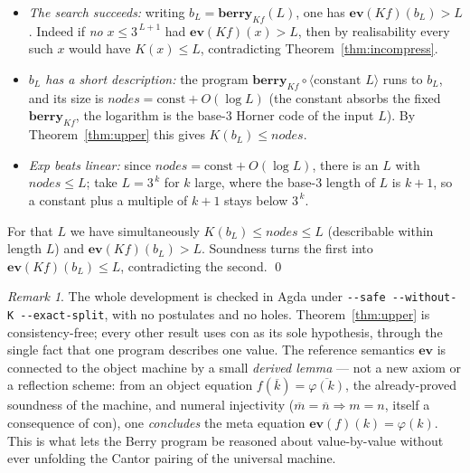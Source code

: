 \documentclass[11pt]{article}
\theoremstyle{plain}
\theoremstyle{definition}
\theoremstyle{remark}
\newtheorem{remark}[theorem]{Remark}
\newcommand{\ev}{\mathbf{ev}}
\newcommand{\Kc}{K}
\newcommand{\nodes}{\mathit{nodes}}
\newcommand{\Berry}{\mathbf{berry}}
\begin{document}
\begin{itemize}
\item \emph{The search succeeds:} writing $b_L=\Berry_{K\!f}(L)$, one has
  $\ev(K\!f)(b_L)>L$. Indeed if \emph{no} $x\le 3^{\,L+1}$ had
  $\ev(K\!f)(x)>L$, then by realisability every such $x$ would have
  $\Kc(x)\le L$, contradicting Theorem~\ref{thm:incompress}.
\item \emph{$b_L$ has a short description:} the program
  $\Berry_{K\!f}\circ\langle\text{constant }L\rangle$ runs to $b_L$, and
  its size is $\nodes = \text{const}+O(\log L)$ (the constant absorbs the
  fixed $\Berry_{K\!f}$, the logarithm is the base-$3$ Horner code of the
  input $L$). By Theorem~\ref{thm:upper} this gives $\Kc(b_L)\le \nodes$.
\item \emph{Exp beats linear:} since $\nodes=\text{const}+O(\log L)$,
  there is an $L$ with $\nodes\le L$; take $L=3^{\,k}$ for $k$ large, where
  the base-$3$ length of $L$ is $k+1$, so a constant plus a multiple of
  $k+1$ stays below $3^{\,k}$.
\end{itemize}
For that $L$ we have simultaneously $\Kc(b_L)\le \nodes\le L$ (describable
within length $L$) and $\ev(K\!f)(b_L)>L$. Soundness turns the first into
$\ev(K\!f)(b_L)\le L$, contradicting the second. \qed

\begin{remark}
The whole development is checked in Agda under
\texttt{-{}-safe -{}-without-K -{}-exact-split}, with no postulates and no
holes. Theorem~\ref{thm:upper} is consistency-free; every other result
uses $\mathrm{con}$ as its sole hypothesis, through the single fact that one
program describes one value. The reference semantics $\ev$ is connected to
the object machine by a small \emph{derived lemma} --- not a new axiom or a
reflection scheme: from an object equation
$f(\overline k)=\overline{\varphi(k)}$, the already-proved soundness of the
machine, and numeral injectivity ($\overline m=\overline n\Rightarrow m=n$,
itself a consequence of $\mathrm{con}$), one \emph{concludes} the meta equation
$\ev(f)(k)=\varphi(k)$. This is what lets the Berry program be reasoned
about value-by-value without ever unfolding the Cantor pairing of the
universal machine.
\end{remark}
\end{document}

